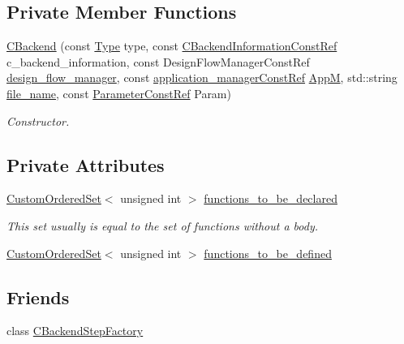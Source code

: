 \subsection*{Private Member Functions}
\begin{DoxyCompactItemize}
\item 
\hyperlink{classCBackend_a1e313cf2e64972680a630fffda96ef7e}{C\+Backend} (const \hyperlink{classCBackend_abadfd9ef309ba4d12e648fe2e3fff08b}{Type} type, const \hyperlink{c__backend__information_8hpp_affe03f2ae5a23aa0efcd9d958c85280d}{C\+Backend\+Information\+Const\+Ref} c\+\_\+backend\+\_\+information, const Design\+Flow\+Manager\+Const\+Ref \hyperlink{classDesignFlowStep_ab770677ddf087613add30024e16a5554}{design\+\_\+flow\+\_\+manager}, const \hyperlink{application__manager_8hpp_abb985163a2a3fb747f6f03b1eaadbb44}{application\+\_\+manager\+Const\+Ref} \hyperlink{classCBackend_ae615cda6d03bdb848968b1eb1e79c273}{AppM}, std\+::string \hyperlink{classCBackend_a11ed652bd65b639d749423ff23867161}{file\+\_\+name}, const \hyperlink{Parameter_8hpp_a37841774a6fcb479b597fdf8955eb4ea}{Parameter\+Const\+Ref} Param)
\begin{DoxyCompactList}\small\item\em Constructor. \end{DoxyCompactList}\end{DoxyCompactItemize}
\subsection*{Private Attributes}
\begin{DoxyCompactItemize}
\item 
\hyperlink{classCustomOrderedSet}{Custom\+Ordered\+Set}$<$ unsigned int $>$ \hyperlink{classCBackend_a64653afeec4c9a88d1111ab3944449ca}{functions\+\_\+to\+\_\+be\+\_\+declared}
\begin{DoxyCompactList}\small\item\em This set usually is equal to the set of functions without a body. \end{DoxyCompactList}\item 
\hyperlink{classCustomOrderedSet}{Custom\+Ordered\+Set}$<$ unsigned int $>$ \hyperlink{classCBackend_adbc767949e8531de9f3d49f4fa4a6533}{functions\+\_\+to\+\_\+be\+\_\+defined}
\end{DoxyCompactItemize}
\subsection*{Friends}
\begin{DoxyCompactItemize}
\item 
class \hyperlink{classCBackend_a42d2c18c6162a3c1113cb8c3fec36a4f}{C\+Backend\+Step\+Factory}
\end{DoxyCompactItemize}


